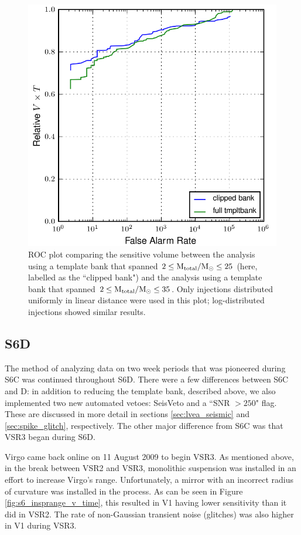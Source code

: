 \begin{figure}[p]
\center
\label{fig:smaller_bank_investigation-roc}
\includegraphics[width=5in]{figures/lower_tmpltbank_investigation/lowmass-lininj_compare_ROC.png}
\caption{ROC plot comparing the sensitive volume between the analysis using a
template bank that spanned $2 \leq \mathrm{M_{total}}/\mathrm{M_\odot} \leq 25$ (here, labelled as
the ``clipped bank") and the analysis using a template bank that spanned $2
\leq \mathrm{M_{total}}/\mathrm{M_\odot} \leq 35$. Only injections distributed uniformly in linear
distance were used in this plot; log-distributed injections showed similar
results.}
\end{figure}

\subsection{S6D}
\label{sec:s6d}

The method of analyzing data on two week periods that was pioneered during S6C
was continued throughout S6D. There were a few differences between S6C and D:
in addition to reducing the template bank, described above, we also implemented
two new automated vetoes: SeisVeto and a ``SNR $> 250$" flag. These are
discussed in more detail in sections \ref{sec:lvea_seismic} and
\ref{sec:spike_glitch}, respectively. The other major difference from S6C was
that VSR3 began during S6D.

Virgo came back online on 11 August 2009 to begin VSR3. As mentioned above, in
the break between VSR2 and VSR3, monolithic suspension was installed in an
effort to increase Virgo's range. Unfortunately, a mirror with an incorrect
radius of curvature was installed in the process. As can be seen in Figure
\ref{fig:s6_insprange_v_time}, this resulted in V1 having lower sensitivity
than it did in VSR2. The rate of non-Gaussian transient noise (glitches) was
also higher in V1 during VSR3.

